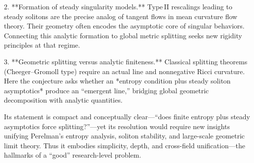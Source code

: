 2. **Formation of steady singularity models.**  
   Type II rescalings leading to steady solitons are the precise analog of tangent flows in mean curvature flow theory. Their geometry often encodes the asymptotic core of singular behaviors. Connecting this analytic formation to global metric splitting seeks new rigidity principles at that regime.  

3. **Geometric splitting versus analytic finiteness.**  
   Classical splitting theorems (Cheeger–Gromoll type) require an actual line and nonnegative Ricci curvature. Here the conjecture asks whether an *entropy condition plus steady soliton asymptotics* produce an “emergent line,” bridging global geometric decomposition with analytic quantities.  

Its statement is compact and conceptually clear—“does finite entropy plus steady asymptotics force splitting?”—yet its resolution would require new insights unifying Perelman’s entropy analysis, soliton stability, and large-scale geometric limit theory.  
Thus it embodies simplicity, depth, and cross-field unification—the hallmarks of a “good” research-level problem.